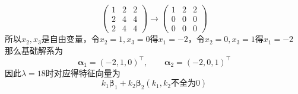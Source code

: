 \begin{solution}
\[\begin{pmatrix}
            1 & 2 & 2 \\
            2 & 4 & 4 \\
            2 & 4 & 4
        \end{pmatrix}
        \longrightarrow
        \begin{pmatrix}
            1 & 2 & 2 \\
            0 & 0 & 0 \\
            0 & 0 & 0
        \end{pmatrix}
    \]
    所以$x_2,x_3$是自由变量，令$x_2=1,x_3=0$得$x_1=-2$，令$x_2=0,x_3=1$得$x_1=-2$
    那么基础解系为
    \[
        \bm{\alpha}_1 = (-2,1,0)^\intercal,\qquad \bm{\alpha}_2 = (-2,0,1)^\intercal
    \]
    因此$\lambda = 18$时对应得特征向量为
    \[ k_1\bm{\beta}_1 + k_2\bm{\beta}_2 (k_1,k_2\text{不全为}0) \]
\end{solution}


